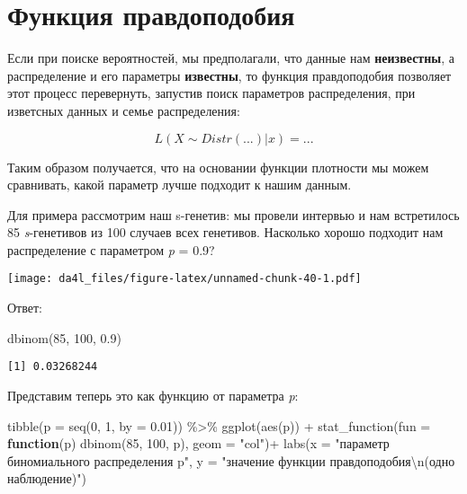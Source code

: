 \documentclass[
]{book}
\newenvironment{Shaded}{\begin{snugshade}}{\end{snugshade}}
\newcommand{\AttributeTok}[1]{\textcolor[rgb]{0.77,0.63,0.00}{#1}}
\newcommand{\ControlFlowTok}[1]{\textcolor[rgb]{0.13,0.29,0.53}{\textbf{#1}}}
\newcommand{\DecValTok}[1]{\textcolor[rgb]{0.00,0.00,0.81}{#1}}
\newcommand{\FloatTok}[1]{\textcolor[rgb]{0.00,0.00,0.81}{#1}}
\newcommand{\FunctionTok}[1]{\textcolor[rgb]{0.00,0.00,0.00}{#1}}
\newcommand{\NormalTok}[1]{#1}
\newcommand{\SpecialCharTok}[1]{\textcolor[rgb]{0.00,0.00,0.00}{#1}}
\newcommand{\StringTok}[1]{\textcolor[rgb]{0.31,0.60,0.02}{#1}}
\begin{document}
\hypertarget{ux444ux443ux43dux43aux446ux438ux44f-ux43fux440ux430ux432ux434ux43eux43fux43eux434ux43eux431ux438ux44f}{%
\section{Функция правдоподобия}\label{ux444ux443ux43dux43aux446ux438ux44f-ux43fux440ux430ux432ux434ux43eux43fux43eux434ux43eux431ux438ux44f}}

Если при поиске вероятностей, мы предполагали, что данные нам \textbf{неизвестны}, а распределение и его параметры \textbf{известны}, то функция правдоподобия позволяет этот процесс перевернуть, запустив поиск параметров распределения, при изветсных данных и семье распределения:

\[L\left(X \sim Distr(...)|x\right) = ...\]

Таким образом получается, что на основании функции плотности мы можем сравнивать, какой параметр лучше подходит к нашим данным.

Для примера рассмотрим наш s-генетив: мы провели интервью и нам встретилось 85 \emph{s}-генетивов из 100 случаев всех генетивов. Насколько хорошо подходит нам распределение с параметром \emph{p} = 0.9?

\texttt{[image: da4l\_files/figure-latex/unnamed-chunk-40-1.pdf]}

Ответ:

\begin{Shaded}
\begin{Highlighting}[]
\FunctionTok{dbinom}\NormalTok{(}\DecValTok{85}\NormalTok{, }\DecValTok{100}\NormalTok{, }\FloatTok{0.9}\NormalTok{)}
\end{Highlighting}
\end{Shaded}

\begin{verbatim}
[1] 0.03268244
\end{verbatim}

Представим теперь это как функцию от параметра \emph{p}:

\begin{Shaded}
\begin{Highlighting}[]
\FunctionTok{tibble}\NormalTok{(}\AttributeTok{p =} \FunctionTok{seq}\NormalTok{(}\DecValTok{0}\NormalTok{, }\DecValTok{1}\NormalTok{, }\AttributeTok{by =} \FloatTok{0.01}\NormalTok{)) }\SpecialCharTok{\%\textgreater{}\%} 
  \FunctionTok{ggplot}\NormalTok{(}\FunctionTok{aes}\NormalTok{(p)) }\SpecialCharTok{+}
  \FunctionTok{stat\_function}\NormalTok{(}\AttributeTok{fun =} \ControlFlowTok{function}\NormalTok{(p) }\FunctionTok{dbinom}\NormalTok{(}\DecValTok{85}\NormalTok{, }\DecValTok{100}\NormalTok{, p), }\AttributeTok{geom =} \StringTok{"col"}\NormalTok{)}\SpecialCharTok{+}
  \FunctionTok{labs}\NormalTok{(}\AttributeTok{x =} \StringTok{"параметр биномиального распределения p"}\NormalTok{,}
       \AttributeTok{y =} \StringTok{"значение функции правдоподобия}\SpecialCharTok{\textbackslash{}n}\StringTok{(одно наблюдение)"}\NormalTok{)}
\end{Highlighting}
\end{Shaded}
\end{document}
